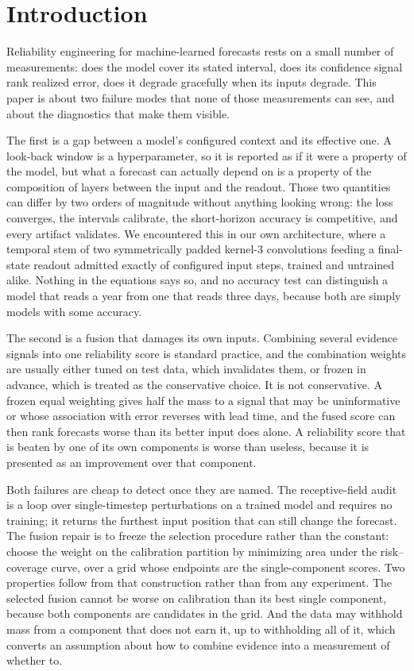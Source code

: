 \section{Introduction}
\label{sec:introduction}

Reliability engineering for machine-learned forecasts rests on a small number of measurements: does the model cover its stated interval, does its confidence signal rank realized error, does it degrade gracefully when its inputs degrade. This paper is about two failure modes that none of those measurements can see, and about the diagnostics that make them visible.

The first is a gap between a model's configured context and its effective one. A look-back window is a hyperparameter, so it is reported as if it were a property of the model, but what a forecast can actually depend on is a property of the composition of layers between the input and the readout. Those two quantities can differ by two orders of magnitude without anything looking wrong: the loss converges, the intervals calibrate, the short-horizon accuracy is competitive, and every artifact validates. We encountered this in our own architecture, where a temporal stem of two symmetrically padded kernel-3 convolutions feeding a final-state readout admitted exactly \robustFieldPublished{} of \robustHistory{} configured input steps, trained and untrained alike. Nothing in the equations says so, and no accuracy test can distinguish a model that reads a year from one that reads three days, because both are simply models with some accuracy.

The second is a fusion that damages its own inputs. Combining several evidence signals into one reliability score is standard practice, and the combination weights are usually either tuned on test data, which invalidates them, or frozen in advance, which is treated as the conservative choice. It is not conservative. A frozen equal weighting gives half the mass to a signal that may be uninformative or whose association with error reverses with lead time, and the fused score can then rank forecasts worse than its better input does alone. A reliability score that is beaten by one of its own components is worse than useless, because it is presented as an improvement over that component.

Both failures are cheap to detect once they are named. The receptive-field audit is a loop over single-timestep perturbations on a trained model and requires no training; it returns the furthest input position that can still change the forecast. The fusion repair is to freeze the selection procedure rather than the constant: choose the weight on the calibration partition by minimizing area under the risk--coverage curve, over a grid whose endpoints are the single-component scores. Two properties follow from that construction rather than from any experiment. The selected fusion cannot be worse on calibration than its best single component, because both components are candidates in the grid. And the data may withhold mass from a component that does not earn it, up to withholding all of it, which converts an assumption about how to combine evidence into a measurement of whether to.

